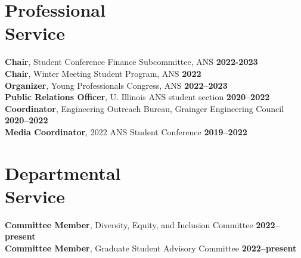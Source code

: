 \documentclass[margin,line]{resume}
\begin{document}
\begin{resume}
    \section{\mysidestyle Professional\\Service}
    \textbf{Chair}, Student Conference Finance Subcommittee, ANS \hfill \textbf{2022-2023}\vspace{.5mm}\\%
                \textbf{Chair}, Winter Meeting Student Program, ANS \hfill \textbf{2022}\vspace{.5mm}\\%
    \textbf{Organizer}, Young Professionals Congress, ANS \hfill \textbf{2022--2023}\vspace{.5mm}\\%
                \textbf{Public Relations Officer}, U. Illinois ANS student section  \hfill \textbf{2020--2022}\vspace{.5mm}\\%
    \textbf{Coordinator}, Engineering Outreach Bureau, Grainger Engineering Council \hfill \textbf{2020--2022}\vspace{.5mm}\\%
                \textbf{Media Coordinator}, 2022 ANS Student Conference \hfill \textbf{2019--2022}\vspace{.5mm}\\%
    \section{\mysidestyle Departmental\\Service}
                \textbf{Committee Member}, Diversity, Equity, and Inclusion Committee \hfill \textbf{2022--present}\vspace{.5mm}\\%
                \textbf{Committee Member}, Graduate Student Advisory Committee \hfill \textbf{2022--present}\vspace{.5mm}\\%


\end{resume}
\end{document}
